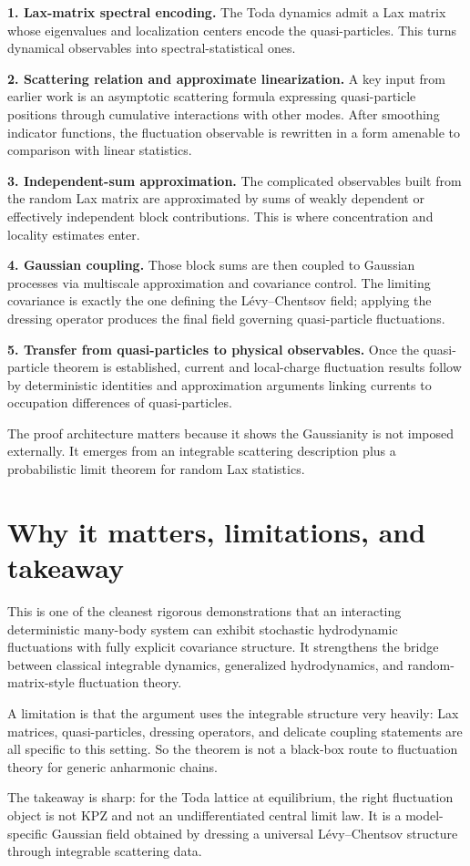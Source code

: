 \documentclass[11pt]{article}
\begin{document}
\textbf{1. Lax-matrix spectral encoding.} The Toda dynamics admit a Lax matrix whose eigenvalues and localization centers encode the quasi-particles. This turns dynamical observables into spectral-statistical ones.

\textbf{2. Scattering relation and approximate linearization.} A key input from earlier work is an asymptotic scattering formula expressing quasi-particle positions through cumulative interactions with other modes. After smoothing indicator functions, the fluctuation observable is rewritten in a form amenable to comparison with linear statistics.

\textbf{3. Independent-sum approximation.} The complicated observables built from the random Lax matrix are approximated by sums of weakly dependent or effectively independent block contributions. This is where concentration and locality estimates enter.

\textbf{4. Gaussian coupling.} Those block sums are then coupled to Gaussian processes via multiscale approximation and covariance control. The limiting covariance is exactly the one defining the L\'evy--Chentsov field; applying the dressing operator produces the final field governing quasi-particle fluctuations.

\textbf{5. Transfer from quasi-particles to physical observables.} Once the quasi-particle theorem is established, current and local-charge fluctuation results follow by deterministic identities and approximation arguments linking currents to occupation differences of quasi-particles.

The proof architecture matters because it shows the Gaussianity is not imposed externally. It emerges from an integrable scattering description plus a probabilistic limit theorem for random Lax statistics.

\section*{Why it matters, limitations, and takeaway}
This is one of the cleanest rigorous demonstrations that an interacting deterministic many-body system can exhibit stochastic hydrodynamic fluctuations with fully explicit covariance structure. It strengthens the bridge between classical integrable dynamics, generalized hydrodynamics, and random-matrix-style fluctuation theory.

A limitation is that the argument uses the integrable structure very heavily: Lax matrices, quasi-particles, dressing operators, and delicate coupling statements are all specific to this setting. So the theorem is not a black-box route to fluctuation theory for generic anharmonic chains.

The takeaway is sharp: for the Toda lattice at equilibrium, the right fluctuation object is not KPZ and not an undifferentiated central limit law. It is a model-specific Gaussian field obtained by dressing a universal L\'evy--Chentsov structure through integrable scattering data.
\end{document}

